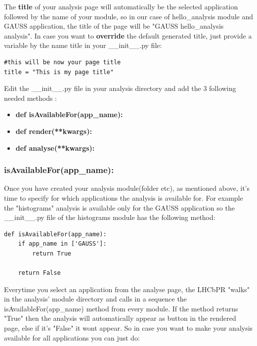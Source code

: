 \documentclass{lhcbnote}
\begin{document}
The {\bf title} of your analysis page will automatically be the selected application followed by the name of your module, so in our case of hello\_analysis module and GAUSS application,
the title of the page will be "GAUSS hello\_analysis analysis". In case you want to {\bf override} the default generated title, just provide a variable by the name title in your \_\_init\_\_.py file:

\vspace{2 mm}

\begin{verbatim}
#this will be now your page title
title = "This is my page title"
\end{verbatim}

\vspace{2 mm}

Edit the \_\_init\_\_.py file in your analysis directory and add the 3 following needed methods :

\begin{itemize}
\item
{\bf def isAvailableFor(app\_name):}
\item
{\bf def render(**kwargs): }
\item
{\bf def analyse(**kwargs):}
\end{itemize}

\subsubsection{isAvailableFor(app\_name):}

Once you have created your analysis module(folder etc), as mentioned above, it's time to specify for which applications the analysis is available for.
For example the "histograms" analysis is available only for the GAUSS application so the \_\_init\_\_.py file of the histograms module has the following method:

\begin{verbatim}
def isAvailableFor(app_name):
    if app_name in ['GAUSS']:
        return True
    
    return False
\end{verbatim}

Everytime you select an application from the analyse page, the LHCbPR "walks" in the analysis' module directory and calls in a sequence 
the isAvailableFor(app\_name) method from every  module. If the method returns "True" then the analysis will automatically appear as 
button in the rendered page, else if it's "False"  it wont appear. So in case you want to make your analysis available for all applications you can just do:
\end{document}
